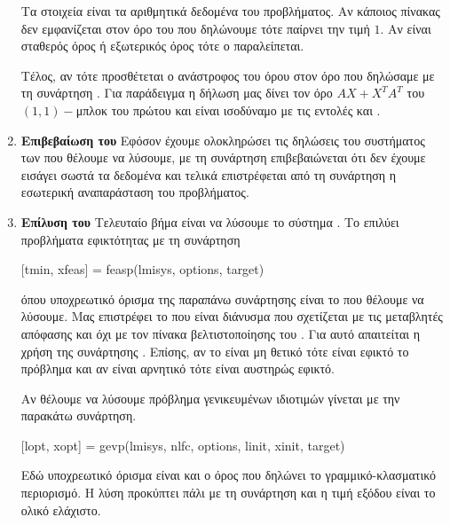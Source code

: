 \begin{enumerate}
        Τα στοιχεία  είναι τα αριθμητικά δεδομένα του προβλήματος. Αν
        κάποιος πίνακας δεν εμφανίζεται στον όρο του  που δηλώνουμε τότε
        παίρνει την τιμή \(1\). Αν είναι σταθερός όρος ή εξωτερικός όρος τότε ο
         παραλείπεται.

        Τέλος, αν  τότε προσθέτεται ο ανάστροφος του όρου στον
        όρο που δηλώσαμε με τη συνάρτηση . Για παράδειγμα η δήλωση
         μας δίνει τον όρο \(AX + X^TA^T\)
        του \((1, 1)-\)μπλοκ του πρώτου  και είναι ισοδύναμο με τις εντολές
         και .
    \item \textbf{Επιβεβαίωση του } Εφόσον έχουμε ολοκληρώσει τις
        δηλώσεις του συστήματος των  που θέλουμε να λύσουμε, με τη
        συνάρτηση  επιβεβαιώνεται ότι δεν έχουμε εισάγει σωστά τα
        δεδομένα και τελικά επιστρέφεται από τη συνάρτηση η εσωτερική αναπαράσταση
        του προβλήματος.
    \item \textbf{Επίλυση του } Τελευταίο βήμα είναι να λύσουμε το
        σύστημα . Το  επιλύει προβλήματα εφικτότητας με τη
        συνάρτηση
        \begin{otherlanguage}{english}
            \begin{center}
                [tmin, xfeas] = feasp(lmisys, options, target)
            \end{center}
        \end{otherlanguage}
        όπου υποχρεωτικό όρισμα της παραπάνω συνάρτησης είναι το  που
        θέλουμε να λύσουμε. Μας επιστρέφει το  που είναι διάνυσμα
        που σχετίζεται με τις μεταβλητές απόφασης  και όχι με τον πίνακα
        βελτιστοποίησης του . Για αυτό απαιτείται η χρήση της συνάρτησης
        . Επίσης, αν το  είναι μη θετικό τότε είναι
        εφικτό το πρόβλημα και αν είναι αρνητικό τότε είναι αυστηρώς εφικτό.

        Αν θέλουμε να λύσουμε πρόβλημα γενικευμένων ιδιοτιμών γίνεται με την
        παρακάτω συνάρτηση.
        \begin{otherlanguage}{english}
            \begin{center}
                [lopt, xopt] = gevp(lmisys, nlfc, options, linit, xinit, target)
            \end{center}
        \end{otherlanguage}
        Εδώ υποχρεωτικό όρισμα είναι και ο όρος  που δηλώνει το
        γραμμικό-κλασματικό περιορισμό. Η λύση προκύπτει πάλι με τη συνάρτηση
         και η τιμή εξόδου  είναι το ολικό ελάχιστο.


\end{enumerate}
